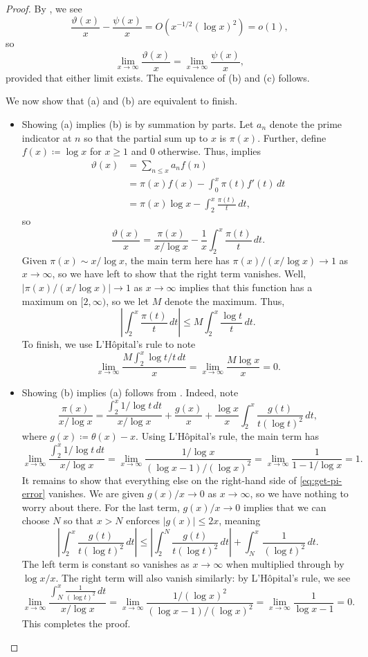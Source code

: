 \documentclass[../notes.tex]{subfiles}
\begin{document}
\begin{proof}
	By , we see
	\[\frac{\vartheta(x)}x-\frac{\psi(x)}x=O\left(x^{-1/2}(\log x)^2\right)=o(1),\]
	so
	\[\lim_{x\to\infty}\frac{\vartheta(x)}x=\lim_{x\to\infty}\frac{\psi(x)}x,\]
	provided that either limit exists. The equivalence of (b) and (c) follows.

	We now show that (a) and (b) are equivalent to finish.
	\begin{itemize}
		\item Showing (a) implies (b) is by summation by parts. Let $a_n$ denote the prime indicator at $n$ so that the partial sum up to $x$ is $\pi(x)$. Further, define $f(x)\coloneqq\log x$ for $x\ge1$ and $0$ otherwise. Thus,  implies
		\begin{align*}
			\vartheta(x) &= \sum_{n\le x}a_nf(n) \\
			&= \pi(x)f(x)-\int_0^x\pi(t)f'(t)\,dt \\
			&= \pi(x)\log x-\int_2^x\frac{\pi(t)}t\,dt,
		\end{align*}
		so
		\[\frac{\vartheta(x)}x=\frac{\pi(x)}{x/\log x}-\frac1x\int_2^x\frac{\pi(t)}t\,dt.\]
		Given $\pi(x)\sim x/\log x$, the main term here has $\pi(x)/(x/\log x)\to1$ as $x\to\infty$, so we have left to show that the right term vanishes. Well, $|\pi(x)/(x/\log x)|\to1$ as $x\to\infty$ implies that this function has a maximum on $[2,\infty)$, so we let $M$ denote the maximum. Thus,
		\[\left|\int_2^x\frac{\pi(t)}t\,dt\right|\le M\int_2^x\frac{\log t}t\,dt.\]
		To finish, we use L'H\^opital's rule to note
		\[\lim_{x\to\infty}\frac{M\int_2^x\log t/t\,dt}{x}=\lim_{x\to\infty}\frac{M\log x}x=0.\]
		\item Showing (b) implies (a) follows from . Indeed, note
		\begin{equation}
			\frac{\pi(x)}{x/\log x}=\frac{\int_2^x1/\log t\,dt}{x/\log x}+\frac{g(x)}x+\frac{\log x}x\int_2^x\frac{g(t)}{t(\log t)^2}\,dt, \label{eq:get-pi-error}
		\end{equation}
		where $g(x)\coloneqq\theta(x)-x$. Using L'H\^opital's rule, the main term has
		\[\lim_{x\to\infty}\frac{\int_2^x1/\log t\,dt}{x/\log x}=\lim_{x\to\infty}\frac{1/\log x}{(\log x-1)/(\log x)^2}=\lim_{x\to\infty}\frac{1}{1-1/\log x}=1.\]
		It remains to show that everything else on the right-hand side of \eqref{eq:get-pi-error} vanishes. We are given $g(x)/x\to0$ as $x\to\infty$, so we have nothing to worry about there. For the last term, $g(x)/x\to0$ implies that we can choose $N$ so that $x>N$ enforces $|g(x)|\le2x$, meaning
		\[\left|\int_2^x\frac{g(t)}{t(\log t)^2}\,dt\right|\le\left|\int_2^N\frac{g(t)}{t(\log t)^2}\,dt\right|+\int_N^x\frac1{(\log t)^2}\,dt.\]
		The left term is constant so vanishes as $x\to\infty$ when multiplied through by $\log x/x$. The right term will also vanish similarly: by L'H\^opital's rule, we see
		\[\lim_{x\to\infty}\frac{\int_N^x\frac1{(\log t)^2}\,dt}{x/\log x}=\lim_{x\to\infty}\frac{1/(\log x)^2}{(\log x-1)/(\log x)^2}=\lim_{x\to\infty}\frac1{\log x-1}=0.\]
		This completes the proof.
		\qedhere
	\end{itemize}
\end{proof}
\end{document}
